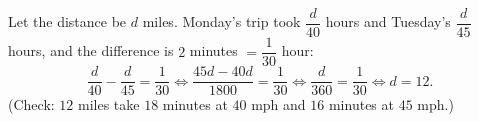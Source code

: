 Let the distance be $d$ miles. Monday's trip took $\dfrac{d}{40}$ hours and Tuesday's $\dfrac{d}{45}$ hours, and the difference is $2$ minutes $=\dfrac{1}{30}$ hour:
\[\dfrac {d}{40}-\dfrac {d}{45}=\dfrac{1}{30}\iff\dfrac{45d-40d}{1800}=\dfrac{1}{30}\iff\dfrac{d}{360}=\dfrac{1}{30}\iff d=\boxed{12}.\]
(Check: $12$ miles take $18$ minutes at $40$ mph and $16$ minutes at $45$ mph.)
